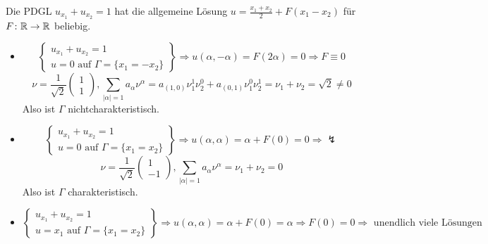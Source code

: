 \begin{bsp} \label{bsp_1}
	Die PDGL $u_{x_1} + u_{x_2} = 1$ \marginnote{[1]} hat die allgemeine Lösung $u = \frac{x_1+x_2}{2} + F(x_1-x_2)$ für $F\colon \mathbb{R} \rightarrow \mathbb{R}$ beliebig. \begin{itemize}
	\item \[ \left. \begin{cases}
		u_{x_1} + u_{x_2} = 1 \\
		u = 0 \text{ auf } \Gamma = \{x_1 = -x_2\} \end{cases} \right\} \Rightarrow u(\alpha,-\alpha) = F(2\alpha) = 0 \Rightarrow F \equiv 0 \]
	\[ \nu = \frac{1}{\sqrt{2}} \begin{pmatrix} 1 \\ 1 \end{pmatrix}, \sum\limits_{|\alpha| = 1} a_\alpha \nu^\alpha = a_{(1,0)} \nu_1^1 \nu_2^0 + a_{(0,1)} \nu_1^0 \nu_2^1 = \nu_1 + \nu_2 = \sqrt{2} \neq 0 \]
	Also ist $\Gamma$ nichtcharakteristisch.
	\item \[ \left. \begin{cases}
		u_{x_1} + u_{x_2} = 1 \\
		u = 0 \text{ auf } \Gamma = \{x_1 = x_2\} \end{cases} \right\} \Rightarrow u(\alpha,\alpha) = \alpha + F(0) = 0 \Rightarrow \lightning  \]
	\[ \nu = \frac{1}{\sqrt{2}} \begin{pmatrix} 1 \\ -1 \end{pmatrix}, \sum\limits_{|\alpha| = 1} a_\alpha \nu^\alpha = \nu_1 + \nu_2 = 0 \]
	Also ist $\Gamma$ charakteristisch.
	\item \[ \left. \begin{cases}
		u_{x_1} + u_{x_2} = 1 \\
		u = x_1 \text{ auf } \Gamma = \{x_1 = x_2\} \end{cases} \right\} \Rightarrow u(\alpha,\alpha) = \alpha + F(0) = \alpha \Rightarrow F(0)=0 \Rightarrow \text{ unendlich viele Lösungen} \]
	\end{itemize}
\end{bsp}
\newpage
		